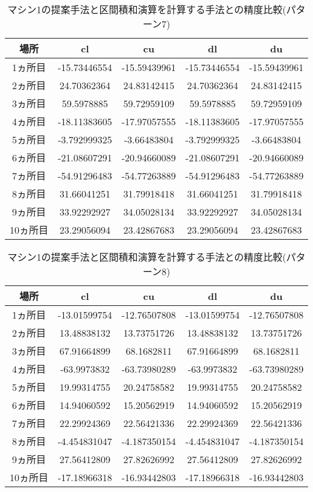 \documentclass[11pt,a4paper]{jsreport}
\theoremstyle{definition}
\begin{document}
\begin{table}[H]
\centering
\begin{tabular}{|c|c|c|c|c|}
\hline
場所 & cl & cu & dl & du \\ \hline
1ヵ所目 & -15.73446554 & -15.59439961 & -15.73446554 & -15.59439961 \\ \hline
2ヵ所目 & 24.70362364 & 24.83142415 & 24.70362364 & 24.83142415 \\ \hline
3ヵ所目 & 59.5978885 & 59.72959109 & 59.5978885 & 59.72959109 \\ \hline
4ヵ所目 & -18.11383605 & -17.97057555 & -18.11383605 & -17.97057555 \\ \hline
5ヵ所目 & -3.792999325 & -3.66483804 & -3.792999325 & -3.66483804 \\ \hline
6ヵ所目 & -21.08607291 & -20.94660089 & -21.08607291 & -20.94660089 \\ \hline
7ヵ所目 & -54.91296483 & -54.77263889 & -54.91296483 & -54.77263889 \\ \hline
8ヵ所目 & 31.66041251 & 31.79918418 & 31.66041251 & 31.79918418 \\ \hline
9ヵ所目 & 33.92292927 & 34.05028134 & 33.92292927 & 34.05028134 \\ \hline
10ヵ所目 & 23.29056094 & 23.42867683 & 23.29056094 & 23.42867683 \\ \hline
\end{tabular}
\caption{マシン1の提案手法と区間積和演算を計算する手法との精度比較(パターン7)}
\end{table}

\begin{table}[H]
\centering
\begin{tabular}{|c|c|c|c|c|}
\hline
場所 & cl & cu & dl & du \\ \hline
1ヵ所目 & -13.01599754 & -12.76507808 & -13.01599754 & -12.76507808 \\ \hline
2ヵ所目 & 13.48838132 & 13.73751726 & 13.48838132 & 13.73751726 \\ \hline
3ヵ所目 & 67.91664899 & 68.1682811 & 67.91664899 & 68.1682811 \\ \hline
4ヵ所目 & -63.9973832 & -63.73980289 & -63.9973832 & -63.73980289 \\ \hline
5ヵ所目 & 19.99314755 & 20.24758582 & 19.99314755 & 20.24758582 \\ \hline
6ヵ所目 & 14.94060592 & 15.20562919 & 14.94060592 & 15.20562919 \\ \hline
7ヵ所目 & 22.29924369 & 22.56421336 & 22.29924369 & 22.56421336 \\ \hline
8ヵ所目 & -4.454831047 & -4.187350154 & -4.454831047 & -4.187350154 \\ \hline
9ヵ所目 & 27.56412809 & 27.82626992 & 27.56412809 & 27.82626992 \\ \hline
10ヵ所目 & -17.18966318 & -16.93442803 & -17.18966318 & -16.93442803 \\ \hline
\end{tabular}
\caption{マシン1の提案手法と区間積和演算を計算する手法との精度比較(パターン8)}
\end{table}
\end{document}
